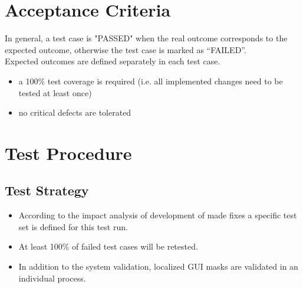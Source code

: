 \documentclass{article}
\begin{document}
\section{Acceptance Criteria}
In general, a test case is "PASSED" when the real outcome corresponds to the expected outcome, otherwise the test case is marked as “FAILED”.\\ Expected outcomes are defined separately in each test case.
\begin{itemize}
\item	a 100\% test coverage is required (i.e. all implemented changes need to be tested at least once)
\item	no critical defects are tolerated 
\end{itemize}

\section{Test Procedure}

\subsection{Test Strategy}
\begin{itemize}
\item According to the impact analysis of development of made fixes a specific test set is defined for this test run.
\item At least 100\% of failed test cases will be retested.
\item In addition to the system validation, localized GUI masks are validated in an individual process.
\end{itemize}
\end{document}
